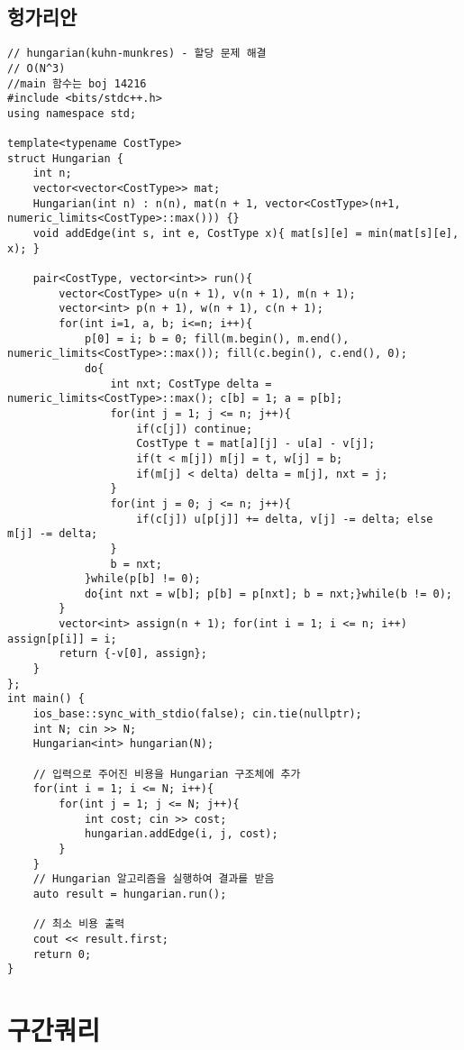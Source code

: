 \documentclass[landscape, 8pt, a4paper, oneside, twocolumn]{extarticle}
\begin{document}
    \subsection{헝가리안}
    \begin{verbatim}
// hungarian(kuhn-munkres) - 할당 문제 해결
// O(N^3)
//main 함수는 boj 14216
#include <bits/stdc++.h>
using namespace std;

template<typename CostType>
struct Hungarian {
    int n;
    vector<vector<CostType>> mat;
    Hungarian(int n) : n(n), mat(n + 1, vector<CostType>(n+1, numeric_limits<CostType>::max())) {}
    void addEdge(int s, int e, CostType x){ mat[s][e] = min(mat[s][e], x); }

    pair<CostType, vector<int>> run(){
        vector<CostType> u(n + 1), v(n + 1), m(n + 1);
        vector<int> p(n + 1), w(n + 1), c(n + 1);
        for(int i=1, a, b; i<=n; i++){
            p[0] = i; b = 0; fill(m.begin(), m.end(), numeric_limits<CostType>::max()); fill(c.begin(), c.end(), 0);
            do{
                int nxt; CostType delta = numeric_limits<CostType>::max(); c[b] = 1; a = p[b];
                for(int j = 1; j <= n; j++){
                    if(c[j]) continue;
                    CostType t = mat[a][j] - u[a] - v[j];
                    if(t < m[j]) m[j] = t, w[j] = b;
                    if(m[j] < delta) delta = m[j], nxt = j;
                }
                for(int j = 0; j <= n; j++){
                    if(c[j]) u[p[j]] += delta, v[j] -= delta; else m[j] -= delta;
                }
                b = nxt;
            }while(p[b] != 0);
            do{int nxt = w[b]; p[b] = p[nxt]; b = nxt;}while(b != 0);
        }
        vector<int> assign(n + 1); for(int i = 1; i <= n; i++) assign[p[i]] = i;
        return {-v[0], assign};
    }
};
int main() {
    ios_base::sync_with_stdio(false); cin.tie(nullptr);
    int N; cin >> N;
    Hungarian<int> hungarian(N);

    // 입력으로 주어진 비용을 Hungarian 구조체에 추가
    for(int i = 1; i <= N; i++){
        for(int j = 1; j <= N; j++){
            int cost; cin >> cost;
            hungarian.addEdge(i, j, cost);
        }
    }
    // Hungarian 알고리즘을 실행하여 결과를 받음
    auto result = hungarian.run();

    // 최소 비용 출력
    cout << result.first;
    return 0;
}
    \end{verbatim}
    \section{구간쿼리}
\end{document}
